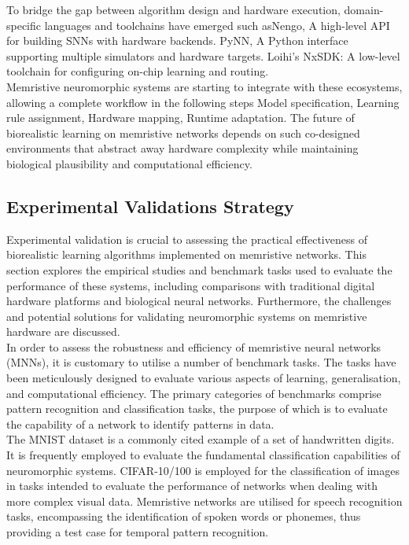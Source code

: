 \noindent To bridge the gap between algorithm design and hardware execution, domain-specific languages and toolchains have emerged such asNengo, A high-level API for building SNNs with hardware backends. PyNN, A Python interface supporting multiple simulators and hardware targets. Loihi's NxSDK: A low-level toolchain for configuring on-chip learning and routing. \\

\noindent Memristive neuromorphic systems are starting to integrate with these ecosystems, allowing a complete workflow in the following steps Model specification, Learning rule assignment, Hardware mapping, Runtime adaptation. The future of biorealistic learning on memristive networks depends on such co-designed environments that abstract away hardware complexity while maintaining biological plausibility and computational efficiency.

\subsection[Experimental Validations Strategy]{Experimental Validations Strategy}

Experimental validation is crucial to assessing the practical effectiveness of biorealistic learning algorithms implemented on memristive networks. This section explores the empirical studies and benchmark tasks used to evaluate the performance of these systems, including comparisons with traditional digital hardware platforms and biological neural networks. Furthermore, the challenges and potential solutions for validating neuromorphic systems on memristive hardware are discussed. \\

\noindent In order to assess the robustness and efficiency of memristive neural networks (MNNs), it is customary to utilise a number of benchmark tasks. The tasks have been meticulously designed to evaluate various aspects of learning, generalisation, and computational efficiency. The primary categories of benchmarks comprise pattern recognition and classification tasks, the purpose of which is to evaluate the capability of a network to identify patterns in data. \\

\noindent The MNIST dataset is a commonly cited example of a set of handwritten digits. It is frequently employed to evaluate the fundamental classification capabilities of neuromorphic systems. CIFAR-10/100 is employed for the classification of images in tasks intended to evaluate the performance of networks when dealing with more complex visual data. Memristive networks are utilised for speech recognition tasks, encompassing the identification of spoken words or phonemes, thus providing a test case for temporal pattern recognition.\\

